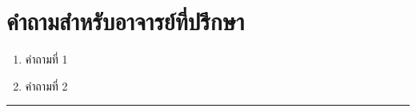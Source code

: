 \documentclass[10pt,a4paper]{article}
\begin{document}
\section*{คำถามสำหรับอาจารย์ที่ปรึกษา}

\begin{enumerate}[nosep, leftmargin=2em]
  \item คำถามที่ 1
  \item คำถามที่ 2
\end{enumerate}

\vspace{16pt}
\noindent\rule{\textwidth}{1.5pt}
\end{document}
